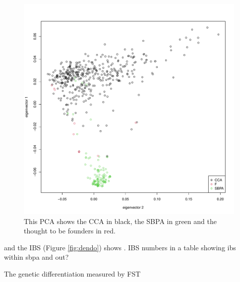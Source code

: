\documentclass[9pt, onecolumn,twoside]{gsajnl}
\begin{document}
\begin{figure}[t]
\centering
\includegraphics[width=\linewidth]{plot_PCA_origin.pdf}
\caption{This PCA shows the CCA in black, the SBPA in green and the thought to be founders in red.}%
\label{fig:pca}
\end{figure}

 and the IBS (Figure  \ref{fig:dendo}) shows . 
 IBS numbers in a table showing ibs within sbpa and out?

The genetic differentiation measured by FST 
\end{document}

